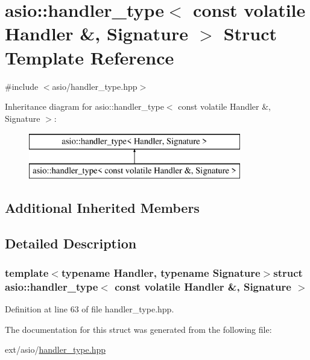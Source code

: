 \hypertarget{structasio_1_1handler__type_3_01const_01volatile_01_handler_01_6_00_01_signature_01_4}{}\section{asio\+:\+:handler\+\_\+type$<$ const volatile Handler \&, Signature $>$ Struct Template Reference}
\label{structasio_1_1handler__type_3_01const_01volatile_01_handler_01_6_00_01_signature_01_4}


{\ttfamily \#include $<$asio/handler\+\_\+type.\+hpp$>$}

Inheritance diagram for asio\+:\+:handler\+\_\+type$<$ const volatile Handler \&, Signature $>$\+:\begin{figure}[H]
\begin{center}
\leavevmode
\includegraphics[height=2.000000cm]{structasio_1_1handler__type_3_01const_01volatile_01_handler_01_6_00_01_signature_01_4}
\end{center}
\end{figure}
\subsection*{Additional Inherited Members}


\subsection{Detailed Description}
\subsubsection*{template$<$typename Handler, typename Signature$>$struct asio\+::handler\+\_\+type$<$ const volatile Handler \&, Signature $>$}



Definition at line 63 of file handler\+\_\+type.\+hpp.



The documentation for this struct was generated from the following file\+:\begin{DoxyCompactItemize}
\item 
ext/asio/\hyperlink{handler__type_8hpp}{handler\+\_\+type.\+hpp}\end{DoxyCompactItemize}
